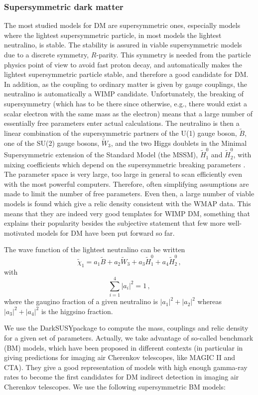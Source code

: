 \documentclass[10pt,aps,pra,reprint,amsmath,amsfonts,amssymb,showpacs,nofootinbib,floatfix]{revtex4-1}
\newcommand{\ds}{{\sc DarkSUSY}}
\begin{document}
\subsubsection{Supersymmetric dark matter}
The most studied models for DM are supersymmetric ones, especially
models where the lightest supersymmetric particle, in most models the
lightest neutralino, is stable. The stability is assured in viable
supersymmetric models due to a discrete symmetry, $R$-parity. This
symmetry is needed from the particle physics point of view to avoid
fast proton decay, and automatically makes the lightest supersymmetric
particle stable, and therefore a good candidate for DM. In addition,
as the coupling to ordinary matter is given by gauge couplings, the
neutralino is automatically a WIMP candidate. Unfortunately, the
breaking of supersymmetry (which has to be there since otherwise,
e.g., there would exist a scalar electron with the same mass as the
electron) means that a large number of essentially free parameters
enter actual calculations. The neutralino is then a linear
combination of the supersymmetric partners of the U(1) gauge boson,
$\tilde B$, one of the SU(2) gauge bosons, $\tilde W_3$, and the two
Higgs doublets in the Minimal Supersymmetric extension of the Standard
Model (the MSSM), $\tilde H_1^0$ and $\tilde H_2^0$, with mixing
coefficients which depend on the supersymmetric breaking parameters
\cite{1984NuPhB.238..453E}. The parameter space is very large, too
large in general to scan efficiently even with the most powerful
computers. Therefore, often simplifying assumptions are made to limit
the number of free parameters. Even then, a large number of viable
models is found which give a relic density consistent with the WMAP
data. This means that they are indeed very good templates for WIMP DM,
something that explains their popularity besides the subjective
statement that few more well-motivated models for DM have been put forward
so far.

The wave function of the lightest neutralino can be written
\begin{equation}
\tilde\chi_1=a_1\tilde B+a_2\tilde W_3+a_3 \tilde H_1^0+a_4\tilde H_2^0\,,
\end{equation}
with
\begin{equation}
\sum_{i=1}^4 |a_i|^2=1\,,
\end{equation}
where the gaugino fraction of a given neutralino is $|a_1|^2+|a_2|^2$
whereas $|a_3|^2+|a_4|^2$ is the higgsino fraction.

We use the \ds package \cite{ds} to compute the mass, couplings and
relic density for a given set of parameters. Actually, we take
advantage of so-called benchmark (BM) models, which have been proposed
in different contexts (in particular in \cite{Bringmann:2008kj} giving
predictions for imaging air Cherenkov telescopes, like MAGIC II and
CTA). They give a good representation of models with high enough
gamma-ray rates to become the first candidates for DM indirect
detection in imaging air Cherenkov telescopes. We use the following
supersymmetric BM models:
\end{document}
